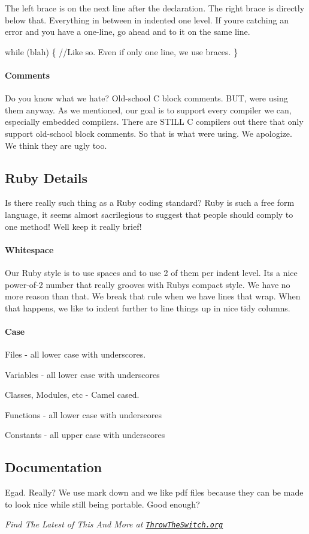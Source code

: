The left brace is on the next line after the declaration. The right brace is directly below that. Everything in between in indented one level. If you\textquotesingle{}re catching an error and you have a one-\/line, go ahead and to it on the same line.


\begin{DoxyCode}
\textcolor{keywordflow}{while} (blah)
\{
    \textcolor{comment}{//Like so. Even if only one line, we use braces.}
\}
\end{DoxyCode}


\paragraph*{Comments}

Do you know what we hate? Old-\/school C block comments. B\+UT, we\textquotesingle{}re using them anyway. As we mentioned, our goal is to support every compiler we can, especially embedded compilers. There are S\+T\+I\+LL C compilers out there that only support old-\/school block comments. So that is what we\textquotesingle{}re using. We apologize. We think they are ugly too.

\subsection*{Ruby Details}

Is there really such thing as a Ruby coding standard? Ruby is such a free form language, it seems almost sacrilegious to suggest that people should comply to one method! We\textquotesingle{}ll keep it really brief!

\paragraph*{Whitespace}

Our Ruby style is to use spaces and to use 2 of them per indent level. It\textquotesingle{}s a nice power-\/of-\/2 number that really grooves with Ruby\textquotesingle{}s compact style. We have no more reason than that. We break that rule when we have lines that wrap. When that happens, we like to indent further to line things up in nice tidy columns.

\paragraph*{Case}


\begin{DoxyItemize}
\item Files -\/ all lower case with underscores.
\item Variables -\/ all lower case with underscores
\item Classes, Modules, etc -\/ Camel cased.
\item Functions -\/ all lower case with underscores
\item Constants -\/ all upper case with underscores
\end{DoxyItemize}

\subsection*{Documentation}

Egad. Really? We use mark down and we like pdf files because they can be made to look nice while still being portable. Good enough?

{\itshape Find The Latest of This And More at \href{https://throwtheswitch.org}{\tt Throw\+The\+Switch.\+org}} 